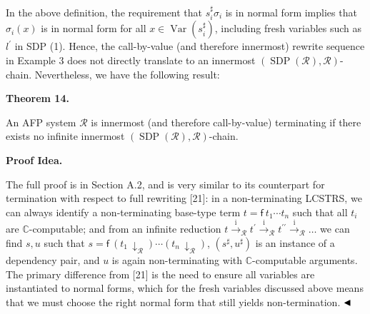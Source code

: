 \documentclass[10pt,a4paper]{amsart}
\begin{document}
 
 
 
In the above definition, the requirement that $s_{i}^{\sharp}\sigma_{i}$ is in normal form implies that $\sigma_{i}(x)$ is in normal form for all $x\in\operatorname{Var}(s_{i}^{\sharp})$, including fresh variables such as $l^{\prime}$ in SDP (1). Hence, the call-by-value (and therefore innermost) rewrite sequence in Example 3 does not directly translate to an innermost $(\operatorname{SDP}(\mathcal{R}),\mathcal{R})$-chain. Nevertheless, we have the following result:\par
 
 
 
\par\medskip\noindent\textbf{Theorem 14.}\par
 
 
An AFP system $\mathcal{R}$ is innermost (and therefore call-by-value) terminating if there exists no infinite innermost $(\operatorname{SDP}(\mathcal{R}),\mathcal{R})$-chain.\par
 
 
 
 
\par\medskip\noindent\textbf{Proof Idea.}\par
 
 
The full proof is in Section A.2, and is very similar to its counterpart for termination with respect to full rewriting [21]: in a non-terminating LCSTRS, we can always identify a non-terminating base-type term $t={\mathsf{f}}\ {{t}_{1}\cdots{t}_{n}}$ such that all $t_{i}$ are $\mathbb{C}$-computable; and from an infinite reduction $t\xrightarrow{\scriptscriptstyle\mathrm{i}}_{\mathcal{R}}t^{\prime}\xrightarrow{\scriptscriptstyle\mathrm{i}}_{\mathcal{R}}t^{\prime\prime}\xrightarrow{\scriptscriptstyle\mathrm{i}}_{\mathcal{R}}\dots$ we can find $s,u$ such that $s={\mathsf{f}}\ {(t_{1}\,{\downarrow}_{\mathcal{R}})\cdots(t_{n}\,{\downarrow}_{\mathcal{R}})}$, $(s^{\sharp},u^{\sharp})$ is an instance of a dependency pair, and $u$ is again non-terminating with $\mathbb{C}$-computable arguments. The primary difference from [21] is the need to ensure all variables are instantiated to normal forms, which for the fresh variables discussed above means that we must choose the right normal form that still yields non-termination. $\hfill\blacktriangleleft$\par
 
\end{document}
